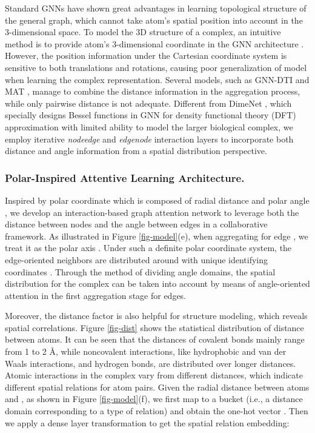 \documentclass[sigconf]{acmart}
\begin{document}
Standard GNNs have shown great advantages in learning topological structure of the general graph, which cannot take atom's spatial position into account in the 3-dimensional space. To model the 3D structure of a complex, an intuitive method is to provide atom's 3-dimensional coordinate in the GNN architecture \cite{danel2020spatial}. However, the position information under the Cartesian coordinate system is sensitive to both translations and rotations, causing poor generalization of model when learning the complex representation. Several models, such as GNN-DTI \cite{klicpera_dimenet_2020} and MAT \cite{maziarka2020molecule}, manage to combine the distance information in the aggregation process, while only pairwise distance is not adequate. Different from DimeNet \cite{klicpera_dimenet_2020}, which specially designs Bessel functions in GNN for density functional theory (DFT) approximation with limited ability to model the larger biological complex, we employ iterative \textit{nodeedge} and \textit{edgenode} interaction layers to incorporate both distance and angle information from a spatial distribution perspective.

\subsubsection{Polar-Inspired Attentive Learning Architecture.}
\label{subsec-embed}
Inspired by polar coordinate which is composed of radial distance  and polar angle , we develop an interaction-based graph attention network to leverage both the distance between nodes and the angle between edges in a collaborative framework. As illustrated in Figure \ref{fig-model}(e)\hide{\ref{fig-angle}}, when aggregating for edge , we treat it as the polar axis . Under such a definite polar coordinate system, the edge-oriented neighbors are distributed around  with unique identifying coordinates . Through the method of dividing angle domains, the spatial distribution for the complex can be taken into account by means of angle-oriented attention in the first aggregation stage for edges.

Moreover, the distance factor is also helpful for structure modeling, which reveals spatial correlations. Figure \ref{fig-dist} shows the statistical distribution of distance between atoms. It can be seen that the distances of covalent bonds mainly range from 1 to 2 {\AA}, while noncovalent interactions, like hydrophobic and van der Waals interactions, and hydrogen bonds, are distributed over longer distances. Atomic interactions in the complex vary from different distances, which indicate different spatial relations for atom pairs. Given the radial distance  between atoms  and , as shown in Figure \ref{fig-model}(f), we first map  to a bucket (i.e., a distance domain corresponding to a type of relation) and obtain the one-hot vector . Then we apply a dense layer transformation to get the spatial relation embedding:
\end{document}
